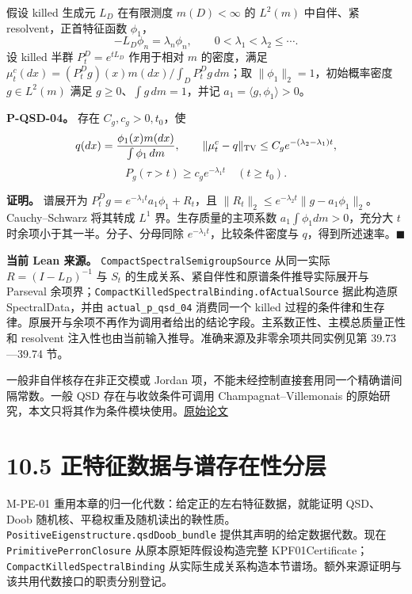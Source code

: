 \documentclass[
  11pt,
  oneside]{book}
\begin{document}
假设 killed 生成元 \(L_D\) 在有限测度 \(m(D)<\infty\) 的 \(L^2(m)\) 中自伴、紧 resolvent，正首特征函数 \(\phi_1\)， \[-L_D\phi_n=\lambda_n\phi_n,\qquad
0<\lambda_1<\lambda_2\le\cdots.\] 设 killed 半群 \(P_t^D=e^{tL_D}\) 作用于相对 \(m\) 的密度，满足 \(\mu_t^c(dx)=(P_t^Dg)(x)m(dx)/\int_DP_t^Dg\,dm\)；取 \(\|\phi_1\|_2=1\)，初始概率密度 \(g\in L^2(m)\) 满足 \(g\ge0\)、\(\int g\,dm=1\)，并记 \(a_1=\langle g,\phi_1\rangle>0\)。

\hypertarget{p-qsd-04}{}\label{p-qsd-04}

\textbf{P-QSD-04。} 存在 \(C_g,c_g>0,t_0\)，使 \[q(dx)=\frac{\phi_1(x)m(dx)}{\int\phi_1\,dm},\qquad
\|\mu_t^c-q\|_{\rm TV}\le C_ge^{-(\lambda_2-\lambda_1)t},\] \[P_g(\tau>t)\ge c_ge^{-\lambda_1t}\quad(t\ge t_0).\]

\textbf{证明。} 谱展开为 \(P_t^Dg=e^{-\lambda_1t}a_1\phi_1+R_t\)，且 \(\|R_t\|_2\le e^{-\lambda_2t}\|g-a_1\phi_1\|_2\)。 Cauchy--Schwarz 将其转成 \(L^1\) 界。生存质量的主项系数 \(a_1\int\phi_1dm>0\)，充分大 \(t\) 时余项小于其一半。分子、分母同除 \(e^{-\lambda_1t}\)，比较条件密度与 \(q\)，得到所述速率。\(\blacksquare\)

\textbf{当前 Lean 来源。} \nolinkurl{CompactSpectralSemigroupSource} 从同一实际 \(R=(I-L_D)^{-1}\) 与 \(S_t\) 的生成关系、紧自伴性和原谱条件推导实际展开与 Parseval 余项界；\nolinkurl{CompactKilledSpectralBinding.ofActualSource} 据此构造原 SpectralData，并由 \nolinkurl{actual_p_qsd_04} 消费同一个 killed 过程的条件律和生存律。原展开与余项不再作为调用者给出的结论字段。主系数正性、主模总质量正性和 resolvent 注入性也由当前输入推导。准确来源及非零余项共同实例见第 39.73---39.74 节。

一般非自伴核存在非正交模或 Jordan 项，不能未经控制直接套用同一个精确谱间隔常数。一般 QSD 存在与收敛条件可调用 Champagnat--Villemonais 的原始研究，本文只将其作为条件模块使用。\href{https://arxiv.org/abs/1404.1349}{原始论文}

\section{10.5 正特征数据与谱存在性分层}\label{ux6b63ux7279ux5f81ux6570ux636eux4e0eux8c31ux5b58ux5728ux6027ux5206ux5c42}

M-PE-01 重用本章的归一化代数：给定正的左右特征数据，就能证明 QSD、Doob 随机核、平稳权重及随机读出的鞅性质。\nolinkurl{PositiveEigenstructure.qsdDoob_bundle} 提供其声明的给定数据代数。现在 \nolinkurl{PrimitivePerronClosure} 从原本原矩阵假设构造完整 KPF01Certificate；\nolinkurl{CompactKilledSpectralBinding} 从实际生成关系构造本节谱场。额外来源证明与该共用代数接口的职责分别登记。
\end{document}
